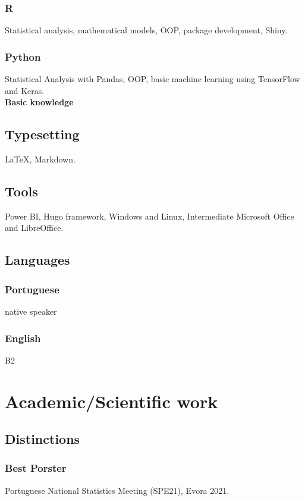 \documentclass[11pt,oneside,a4paper,titlepage]{article}
\begin{document}
\subsubsection{R}
Statistical analysis, mathematical models, OOP, package development, Shiny.
\subsubsection{Python}
Statistical Analysis with Pandas, OOP, basic machine learning using TensorFlow and Keras.
\\[2mm]
\textcolor{textGrey}{\textbf{Basic knowledge}}\\

\subsection{  Typesetting}
 \quad \LaTeX, Markdown.

\subsection{  Tools}
 \quad Power BI, Hugo framework, Windows and Linux, Intermediate Microsoft Office and LibreOffice.

\subsection{  Languages}
\subsubsection{Portuguese}
native speaker
\subsubsection{English}
B2

\section{Academic/Scientific work}

\subsection{  Distinctions}
\subsubsection{Best Porster}
Portuguese National Statistics Meeting (SPE21), Evora 2021.
\end{document}
